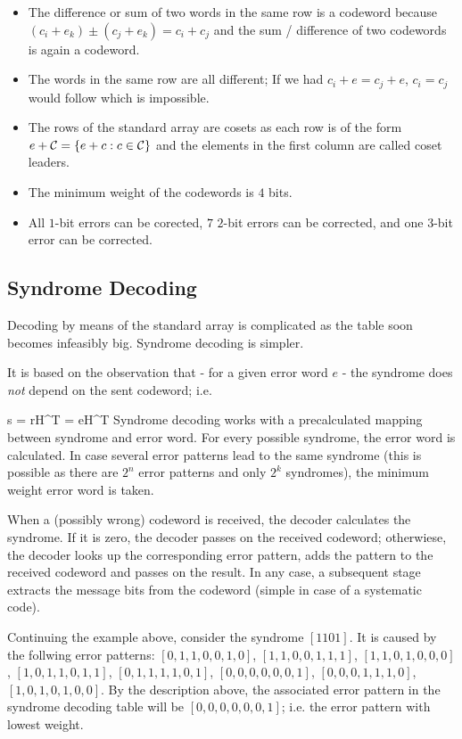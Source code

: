 \begin{itemize}

\item The difference or sum of two words in the same row is a codeword because $(c_i + e_k) \pm (c_j + e_k) = c_i + c_j$ and the sum / difference of two codewords is again a codeword.

\item The words in the same row are all different; If we had $c_i + e = c_j + e$, $c_i = c_j$ would follow which is impossible.

\item The rows of the standard array are cosets as each row is of the form $e + \mathcal{C} = \{e + c: c \in \mathcal{C}\}$ and the elements in the first column are called coset leaders.

\item The minimum weight of the codewords is $4$ bits.

\item All $1$-bit errors can be corected, $7$ $2$-bit errors can be corrected, and one $3$-bit error can be corrected.

\end{itemize}


\subsection{Syndrome Decoding}

Decoding by means of the standard array is complicated as the table soon becomes infeasibly big. Syndrome decoding is simpler.

It is based on the observation that - for a given error word $e$ - the syndrome does \emph{not} depend on the sent codeword; i.e.

\bee
s = rH^T = eH^T
\eee
%
Syndrome decoding works with a precalculated mapping between syndrome and error word. For every possible syndrome, the error word is calculated. In case several error patterns lead to the same syndrome (this is possible as there are $2^n$ error patterns and only $2^k$ syndromes), the minimum weight error word is taken. 

When a (possibly wrong) codeword is received, the decoder calculates the syndrome. If it is zero, the decoder passes on the received codeword; otherwiese, the decoder looks up the corresponding error pattern, adds the pattern to the received codeword and passes on the result. In any case, a subsequent stage extracts the message bits from the codeword (simple in case of a systematic code).

Continuing the example above, consider the syndrome $[1 1 0 1]$. It is caused by the follwing error patterns: $[0,1,1,0,0,1,0]$, $[1,1,0,0,1,1,1]$, $[1,1,0,1,0,0,0]$, $[1,0,1,1,0,1,1]$, $[0,1,1,1,1,0,1]$, $[0,0,0,0,0,0,1]$, $[0,0,0,1,1,1,0]$, $[1,0,1,0,1,0,0]$. By the description above, the associated error pattern in the syndrome decoding table will be $[0,0,0,0,0,0,1]$; i.e. the error pattern with lowest weight.


